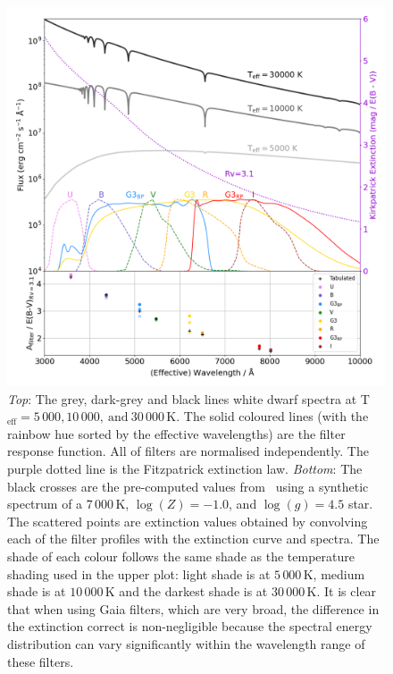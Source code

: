 \documentclass[fleqn,usenatbib]{rasti}
\begin{document}
\begin{figure}
    \centering
    \includegraphics[width=\textwidth]{fig_03_reddening_filter.png}
    \caption{\textit{Top}: The grey, dark-grey and black
    lines white dwarf spectra at
    T$_{\mathrm{eff}}=5\,000, 10\,000, \mathrm{\ and\ } 30\,000$\,K. The solid
    coloured lines (with the rainbow hue sorted by the effective wavelengths)
    are the filter response function. All of filters are normalised
    independently. The purple dotted line is the Fitzpatrick extinction law.
    \textit{Bottom}: The black crosses are the pre-computed values
    from~\citet{2011ApJ...737..103S} using a synthetic spectrum of a $7\,000$\,K,
    $\log(Z) = -1.0$, and $\log(g) = 4.5$ star. The scattered points are
    extinction values obtained by convolving each of the filter profiles with
    the extinction curve and spectra. The shade of each colour follows the
    same shade as the temperature shading used in the upper plot: light shade
    is at $5\,000$\,K, medium shade is at $10\,000$\,K and the darkest shade is at
    $30\,000$\,K. It is clear that when using Gaia filters, which are very broad,
    the difference in the extinction correct is non-negligible because the
    spectral energy distribution can vary significantly within the wavelength
    range of these filters.}
    \label{fig:interstellar_reddening}
\end{figure}
\end{document}
